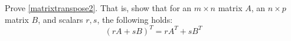 \begin{enumialphparenastyle}
\begin{ex} Prove \ref{matrixtranspose2}. That is, show that for an $m \times n$ matrix $A$, an $n \times p$ matrix $B$, and scalars $r, s$, the following holds:
\[
\left( rA + sB \right) ^T = rA^{T} + sB^{T}
\]
\end{ex}
 
\end{enumialphparenastyle}